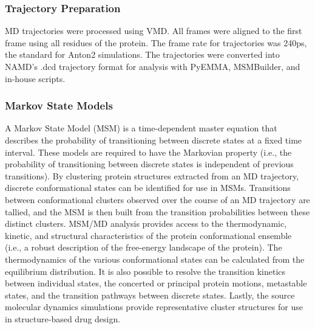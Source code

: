 \subsubsection{Trajectory Preparation}
MD trajectories were processed using VMD\cite{Humphrey1996}. All frames were aligned to the first frame using all residues of the protein. The frame rate for trajectories was 240ps, the standard for Anton2 simulations. The trajectories were converted into NAMD's .dcd trajectory format for analysis with PyEMMA\cite{Scherer2015}, MSMBuilder\cite{Beauchamp2011}, and in-house scripts.


\subsubsection{Markov State Models}
A Markov State Model (MSM) is a time-dependent master equation that describes the probability of transitioning between discrete states at a fixed time interval. These models are required to have the Markovian property (i.e., the probability of transitioning between discrete states is independent of previous transitions). By clustering protein structures extracted from an MD trajectory, discrete conformational states can be identified for use in MSMs\cite{Pande2010,Beauchamp2011,Prinz2011,Prinz2011a}. Transitions between conformational clusters observed over the course of an MD trajectory are tallied, and the MSM is then built from the transition probabilities between these distinct clusters. MSM/MD analysis provides access to the thermodynamic, kinetic, and structural characteristics of the protein conformational ensemble (i.e., a robust description of the free-energy landscape of the protein)\cite{Pande2010,Beauchamp2011,Prinz2011,Prinz2011a,Senne2012,Cronkite-Ratcliff2013}. The thermodynamics of the various conformational states can be calculated from the equilibrium distribution. It is also possible to resolve the transition kinetics between individual states, the concerted or principal protein motions, metastable states, and the transition pathways between discrete states\cite{Beauchamp2011,Prinz2011,Senne2012}. Lastly, the source molecular dynamics simulations provide representative cluster structures for use in structure-based drug design\cite{Cronkite-Ratcliff2013}.

